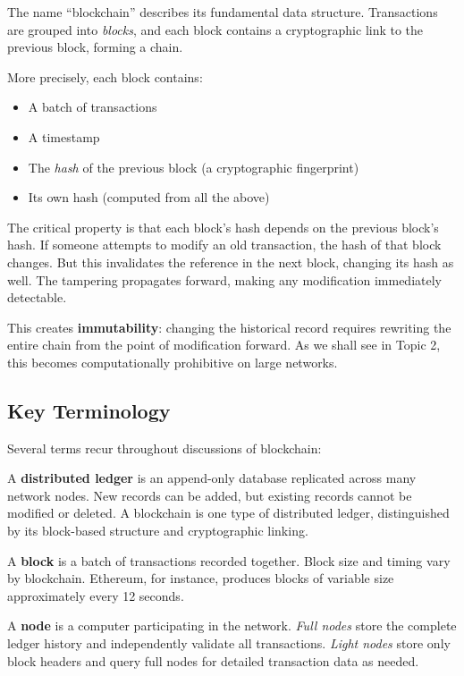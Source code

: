 \documentclass[11pt,a4paper]{article}
\newcommand{\keyword}[1]{\textbf{\textcolor{AccentOrange}{#1}}}
\begin{document}
The name ``blockchain'' describes its fundamental data structure. Transactions are grouped into \textit{blocks}, and each block contains a cryptographic link to the previous block, forming a chain.

More precisely, each block contains:
\begin{itemize}
    \item A batch of transactions
    \item A timestamp
    \item The \textit{hash} of the previous block (a cryptographic fingerprint)
    \item Its own hash (computed from all the above)
\end{itemize}

The critical property is that each block's hash depends on the previous block's hash. If someone attempts to modify an old transaction, the hash of that block changes. But this invalidates the reference in the next block, changing its hash as well. The tampering propagates forward, making any modification immediately detectable.

This creates \keyword{immutability}: changing the historical record requires rewriting the entire chain from the point of modification forward. As we shall see in Topic 2, this becomes computationally prohibitive on large networks.

\subsection{Key Terminology}

Several terms recur throughout discussions of blockchain:

A \keyword{distributed ledger} is an append-only database replicated across many network nodes. New records can be added, but existing records cannot be modified or deleted. A blockchain is one type of distributed ledger, distinguished by its block-based structure and cryptographic linking.

A \keyword{block} is a batch of transactions recorded together. Block size and timing vary by blockchain. Ethereum, for instance, produces blocks of variable size approximately every 12 seconds.

A \keyword{node} is a computer participating in the network. \textit{Full nodes} store the complete ledger history and independently validate all transactions. \textit{Light nodes} store only block headers and query full nodes for detailed transaction data as needed.
\end{document}
